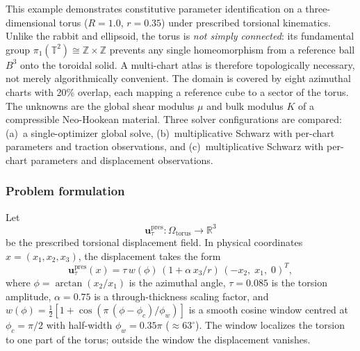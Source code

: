 \documentclass[sort&compress]{svjour3} %
\begin{document}
This example demonstrates constitutive parameter identification on a three-dimensional torus ($R=1.0$, $r=0.35$) under prescribed torsional kinematics. Unlike the rabbit and ellipsoid, the torus is \emph{not simply connected}: its fundamental group $\pi_1(\mathbb{T}^2)\cong\mathbb{Z}\times\mathbb{Z}$ prevents any single homeomorphism from a reference ball $B^3$ onto the toroidal solid. A multi-chart atlas is therefore topologically necessary, not merely algorithmically convenient. The domain is covered by eight azimuthal charts with 20\% overlap, each mapping a reference cube to a sector of the torus. The unknowns are the global shear modulus $\mu$ and bulk modulus $K$ of a compressible Neo-Hookean material. Three solver configurations are compared: (a)~a single-optimizer global solve, (b)~multiplicative Schwarz with per-chart parameters and traction observations, and (c)~multiplicative Schwarz with per-chart parameters and displacement observations.

\subsubsection{Problem formulation}

Let
\begin{equation}
\mathbf{u}_{\tau}^{\mathrm{pres}}:\Omega_{\mathrm{torus}}\rightarrow \mathbb{R}^3
\label{eq:torus_prescribed_u}
\end{equation}
be the prescribed torsional displacement field. In physical coordinates $x=(x_1,x_2,x_3)$, the displacement takes the form
\begin{equation}
\mathbf{u}_{\tau}^{\mathrm{pres}}(x) = \tau\,w(\phi)\,(1+\alpha\, x_3/r)\,(-x_2,\;x_1,\;0)^T,
\label{eq:torus_torsion_formula}
\end{equation}
where $\phi=\arctan(x_2/x_1)$ is the azimuthal angle, $\tau=0.085$ is the torsion amplitude, $\alpha=0.75$ is a through-thickness scaling factor, and $w(\phi)=\tfrac{1}{2}[1+\cos(\pi\,(\phi-\phi_c)/\phi_w)]$ is a smooth cosine window centred at $\phi_c=\pi/2$ with half-width $\phi_w=0.35\pi$ (${\approx}63^{\circ}$). The window localizes the torsion to one part of the torus; outside the window the displacement vanishes.
\end{document}
